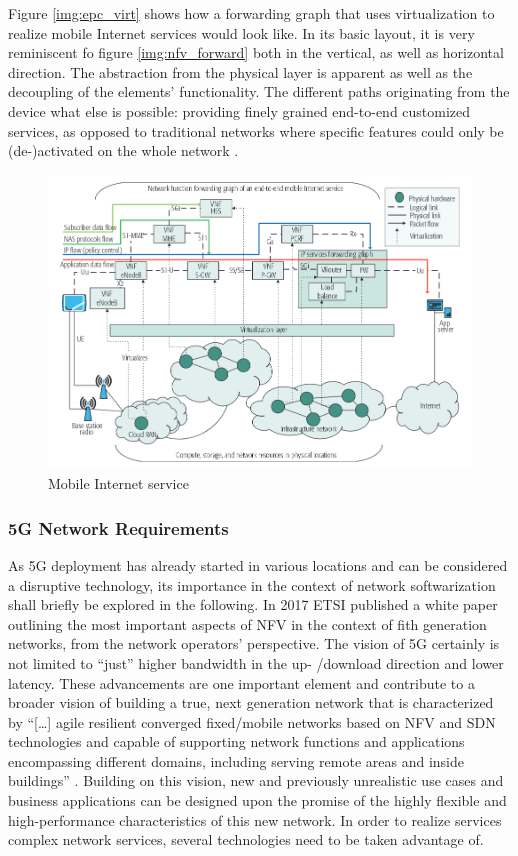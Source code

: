 Figure \ref{img:epc_virt} shows how a forwarding graph that uses virtualization to realize mobile Internet services would look like. In its basic layout, it is very reminiscent fo figure \ref{img:nfv_forward} both in the vertical, as well as horizontal direction. The abstraction from the physical layer is apparent as well as the decoupling of the elements' functionality. The different paths originating from the device what else is possible: providing finely grained end-to-end customized services, as opposed to traditional networks where specific features could only be (de-)activated on the whole network  \cite{abdelwahab2016network}.

\begin{figure}[h]
	\includegraphics[width=1\linewidth]{images/mobileInternetServices.png}
	\caption{Mobile Internet service \cite{abdelwahab2016network}}
	\label{img:mobile}
\end{figure}

\subsubsection{5G Network Requirements}
As 5G deployment has already started in various locations and can be considered a disruptive technology, its importance in the context of network softwarization shall briefly be explored in the following. In 2017 ETSI published a white paper outlining the most important aspects of NFV in the context of fith generation networks, from the network operators' perspective. The vision of 5G certainly is not limited to ``just'' higher bandwidth in the up- /download  direction and lower latency. These advancements are one important element and contribute to a broader vision of  building a true, next generation network that is characterized by ``[\dots] agile resilient converged fixed/mobile networks based on NFV and SDN technologies and capable of supporting network functions and applications encompassing different domains, including serving remote areas and inside buildings'' \cite{nfv5g}. Building on this vision, new and previously unrealistic use cases and business applications can be designed upon the promise of the highly flexible and high-performance characteristics of this new network. In order to realize services complex network services, several technologies need to be taken advantage of. 


